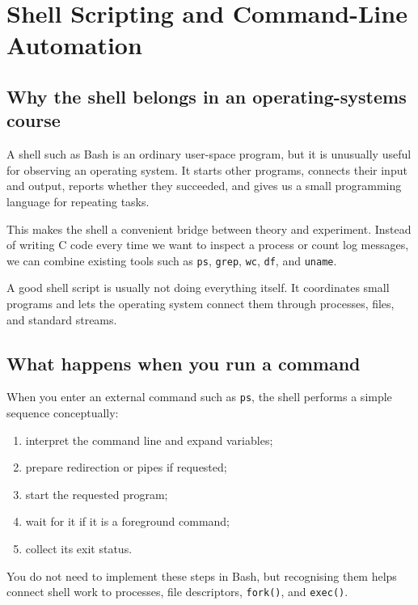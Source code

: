 \chapter{Shell Scripting and Command-Line Automation}\label{ch:shell}

\section{Why the shell belongs in an operating-systems course}
A shell such as Bash is an ordinary user-space program, but it is unusually useful for observing an operating system. It starts other programs, connects their input and output, reports whether they succeeded, and gives us a small programming language for repeating tasks.

This makes the shell a convenient bridge between theory and experiment. Instead of writing C code every time we want to inspect a process or count log messages, we can combine existing tools such as \texttt{ps}, \texttt{grep}, \texttt{wc}, \texttt{df}, and \texttt{uname}.

\begin{keyidea}
A good shell script is usually not doing everything itself. It coordinates small programs and lets the operating system connect them through processes, files, and standard streams.
\end{keyidea}

\section{What happens when you run a command}
When you enter an external command such as \texttt{ps}, the shell performs a simple sequence conceptually:
\begin{enumerate}
  \item interpret the command line and expand variables;
  \item prepare redirection or pipes if requested;
  \item start the requested program;
  \item wait for it if it is a foreground command;
  \item collect its exit status.
\end{enumerate}
You do not need to implement these steps in Bash, but recognising them helps connect shell work to processes, file descriptors, \texttt{fork()}, and \texttt{exec()}.

